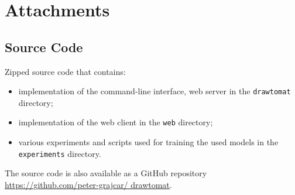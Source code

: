\documentclass[12pt,a4paper]{report}
\let\openright=\clearpage
\begin{document}



\tableofcontents













\listoffigures

\listoftables


\appendix
\chapter{Attachments}

\section{Source Code}
\label{attachment:sources}

Zipped source code that contains:
\begin{itemize}
\item implementation of the command-line interface, web server in the \verb|drawtomat| directory; 
\item implementation of the web client in the \verb|web| directory;
\item various experiments and scripts used for training the used models in the \verb|experiments| directory. 
\end{itemize}
The source code is also available as a GitHub repository \url{https://github.com/peter-grajcar/ drawtomat}.

\openright
\end{document}

